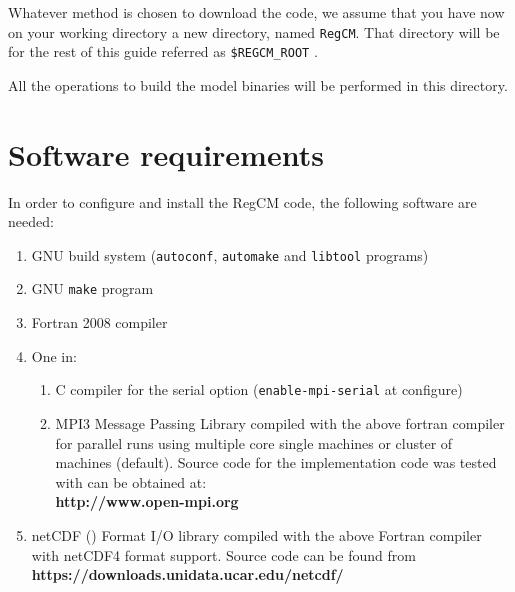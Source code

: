 
Whatever method is chosen to download the code, we assume that you have now
on your working directory a new directory, named \verb=RegCM=.
That directory will be for the rest of this guide referred as 
\verb=$REGCM_ROOT= .

All the operations to build the model binaries will be performed in this
directory.

\section{Software requirements}

In order to configure and install the RegCM code, the following software are
needed:

\begin{enumerate}
    \item GNU build system (\verb=autoconf=, \verb=automake= and
        \verb=libtool= programs)
    \item GNU \verb=make= program
    \item Fortran 2008 compiler
    \item One in:
  \begin{enumerate}
    \item C compiler for the serial option (\verb=enable-mpi-serial= at
      configure)
    \item MPI3 Message Passing Library compiled with the above fortran compiler
     for parallel runs using multiple core single machines or cluster of
     machines (default).  Source code for the implementation code was tested
     with can be obtained at: \\
     {\bf http://www.open-mpi.org}
  \end{enumerate}
\item netCDF (\cite{Rew_90}) Format I/O library compiled with the above
  Fortran compiler with netCDF4 format support. Source code can be found from \\
  {\bf https://downloads.unidata.ucar.edu/netcdf/} \\
\end{enumerate}

